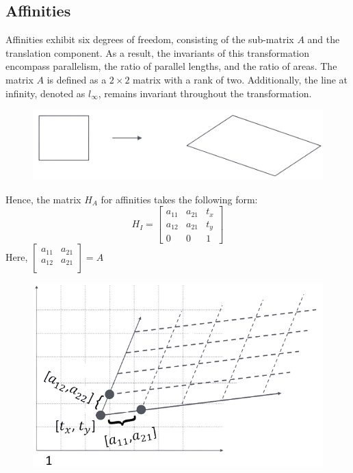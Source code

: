 \documentclass[12pt, a4paper]{report}
\begin{document}
    \subsection{Affinities}
    Affinities exhibit six degrees of freedom, consisting of the sub-matrix $A$ and the translation component. 
    As a result, the invariants of this transformation encompass parallelism, the ratio of parallel lengths, and the ratio of areas. 
    The matrix $A$ is defined as a $2 \times 2$ matrix with a rank of two. 
    Additionally, the line at infinity, denoted as $l_{\infty}$, remains invariant throughout the transformation.
    \begin{figure}[H]
        \centering
        \includegraphics[width=0.25\linewidth]{images/affinities.png}
    \end{figure}
    Hence, the matrix $H_A$ for affinities takes the following form:
    \[H_I=
    \begin{bmatrix}
        a_{11} & a_{21} & t_x \\
        a_{12} & a_{21} & t_y \\
        0 & 0 & 1
    \end{bmatrix}\]
    Here, $
    \begin{bmatrix}
        a_{11} & a_{21} \\
        a_{12} & a_{21} \\
    \end{bmatrix}
    =A$
    \begin{figure}[H]
        \centering
        \includegraphics[width=0.3\linewidth]{images/affinities1.png}
    \end{figure}
\end{document}
